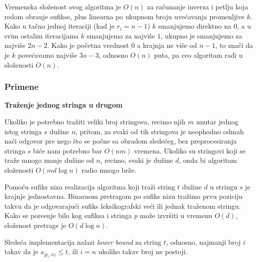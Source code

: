 \noindent
\begin{minipage}[l]{\textwidth}

\end{minipage}

Vremenska slo\v zenost ovog algoritma je $O(n)$ za ra\v cunanje inverza i petlju koja redom obra\dj uje sufikse, plus linearna po ukupnom broju uve\' cavanja promenljive $k$. Kako u ta\v cno jednoj iteraciji (kad je $r_i = n-1$) $k$ smanjujemo direktno na $0$, a u svim ostalim iteracijama $k$ smanjujemo za najvi\v se $1$, ukupno je smanjujemo za najvi\v se $2n-2$. Kako je po\v cetna vrednost $0$ a krajnja ne vi\v se od $n-1$, to zna\v ci da je $k$ pove\' cavamo najvi\v se $3n-3$, odnosno $O(n)$ puta, pa ceo algoritam radi u slo\v zenosti $O(n)$.

\subsubsection{Primene}

\noindent
\textbf{Tra\v zenje jednog stringa u drugom}

Ukoliko je potrebno tra\v ziti veliki broj stringova, recimo njih $m$ unutar jednog istog stringa $s$ du\v zine $n$, pritom, za svaki od tih stringova je neophodno odmah na\' ci odgovor pre nego \v sto se po\v cne sa obradom slede\' ceg, bez preprocesiranja stringa $s$ bi\' ce nam potrebno bar $O(nm)$ vremena. Ukoliko su stringovi koji se tra\v ze mnogo manje du\v zine od $n$, recimo, svaki je du\v zine $d$, onda bi algoritam slo\v zenosti $O(md\log n)$ radio mnogo br\v ze.

Pomo\' cu sufiks niza realizacija algoritma koji tra\v zi string $t$ du\v zine $d$ u stringu $s$ je krajnje jednostavna. Binarnom pretragom po sufiks nizu tra\v zimo prvu poziciju takvu da je odgovaraju\' ci sufiks leksikografski ve\' ci ili jednak tra\v zenom stringu. Kako se pore\dj enje bilo kog sufiksa i stringa $p$ mo\v ze izvr\v siti u vremenu $O(d)$, slo\v zenost pretrage je $O(d \log n)$.

Slede\' ca implementacija nalazi \textit{lower bound} za string $t$, odnosno, najmanji broj $i$ takav da je $s_{[p_i, n)} \leq t$, ili $i=n$ ukoliko takav broj ne postoji.

\noindent
\begin{minipage}[l]{\textwidth}

\end{minipage}

